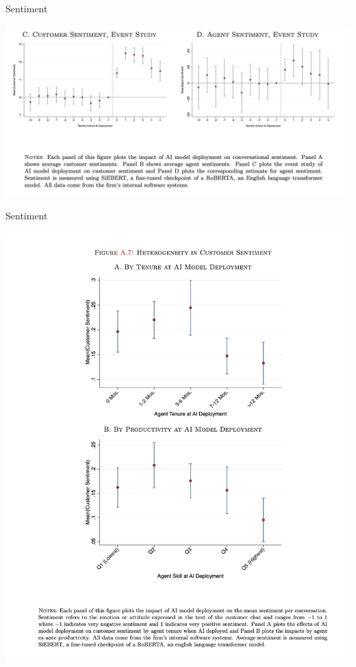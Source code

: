 \documentclass{beamer}
\begin{document}
\begin{frame}{Sentiment}
\begin{center}
\includegraphics[scale=0.35]{./lecture_includes/brynn8}
\end{center}
\end{frame}


\begin{frame}{Sentiment}
\begin{center}
\includegraphics[scale=0.3]{./lecture_includes/brynn11}
\end{center}
\end{frame}
\end{document}
